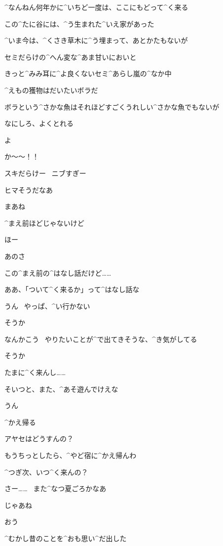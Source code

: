 \page[37]
\Ayase ^{なんねん}{何年}かに^{いちど}{一度}は、ここにもどって^{く}{来}る

\Ayase この^{たに}{谷}には、^{う}{生}まれた^{いえ}{家}があった

\Ayase ^{いま}{今}は、^{くさき}{草木}に^{う}{埋}まって、あとかたもないが

\page[38]
\Ayase セミだらけの^{へん}{変}な^{あま}{甘}いにおいと

\Ayase きっと^{みみ}{耳}に^{よ}{良}くないセミ^{あらし}{嵐}の^{なか}{中}

\page[39]
\Ayase ^{えもの}{獲物}はだいたいボラだ

\Ayase ボラという^{さかな}{魚}はそれほどすごくうれしい^{さかな}{魚}でもないが

\Ayase なにしろ、よくとれる

\page[42]
\Makki よ

\Ayase か〜〜！！

\Makki スキだらけー
\ ニブすぎー

\page[43]
\Ayase ヒマそうだなあ

\Makki まあね

\Makki ^{まえ}{前}ほどじゃないけど

\page[44]
\Ayase ほー

\Makki あのさ

\Makki この^{まえ}{前}の^{はなし}{話}だけど……

\Ayase ああ、「ついて^{く}{来}るか」って^{はなし}{話}な

\Makki うん
\ やっぱ、^{い}{行}かない

\Ayase そうか

\Makki なんかこう
\ やりたいことが^{で}{出}てきそうな、^{き}{気}がしてる

\Ayase そうか

\page[45]
\Ayase たまに^{く}{来}んし……

\Ayase そいつと、また、^{あそ}{遊}んでけえな

\Makki うん

\page[47]
\Makki ^{かえ}{帰}る

\Makki アヤセはどうすんの？

\Ayase もうちっとしたら、^{やど}{宿}に^{かえ}{帰}んわ

\Makki ^{つぎ}{次}、いつ^{く}{来}んの？

\Ayase さー……
\ また^{なつ}{夏}ごろかなあ

\page[49]
\Makki じゃあね

\Ayase おう

\page[50]
\Ayase ^{むかし}{昔}のことを^{おも}{思}い^{だ}{出}した

